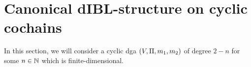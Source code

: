 \documentclass[\MainFolder/Text.tex]{subfiles}
\begin{document}
\section{Canonical dIBL-structure on cyclic cochains
}

\label{Sec:Alg3}
 
In this section, we will consider a cyclic dga $(V,\Pi,m_1,m_2)$ of degree $2-n$ for some $n\in \mathbb{N}$ which is finite-dimensional. %
% 
%
\end{document}
